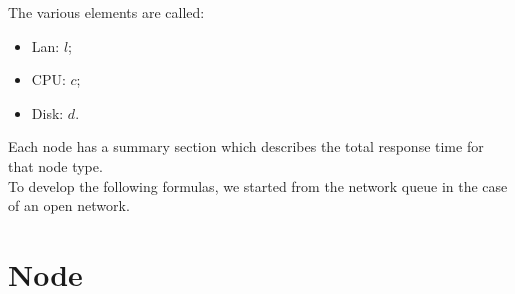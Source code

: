 \documentclass[11pt]{article}
\begin{document}
The various elements are called:
\begin{itemize}
\item Lan: $l$;
\item CPU: $c$;
\item Disk: $d$.
\end{itemize}
Each node has a summary section which describes the total response time for that node type.\\
To develop the following formulas, we started from the network queue in the case of an open network. 

\section{Node}


%
%
%
%
%
\end{document}
